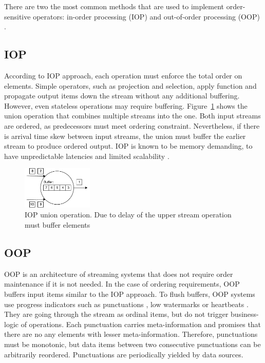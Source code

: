
\label {fs-typical}

There are two the most common methods that are used to implement order-sensitive operators: in-order processing (IOP) \cite{Arasu:2006:CCQ:1146461.1146463, Cranor:2003:GSD:872757.872838, hammad2004optimizing} and out-of-order processing (OOP) \cite{Li:2008:OPN:1453856.1453890}.

\subsection{IOP}

According to IOP approach, each operation must enforce the total order on elements. Simple operators, such as projection and selection, apply function and propagate output items down the stream without any additional buffering. However, even stateless operations may require buffering. Figure~\ref{iop} shows the union operation that combines multiple streams into the one. Both input streams are ordered, as predecessors must meet ordering constraint. Nevertheless, if there is arrival time skew between input streams, the union must buffer the earlier stream to produce ordered output. IOP is known to be memory demanding, to have unpredictable latencies and limited scalability \cite{Li:2008:OPN:1453856.1453890}.

\begin{figure}[htbp]
  \centering
  \includegraphics[width=0.30\textwidth]{pics/iop}
  \caption{IOP union operation. Due to delay of the upper stream operation must buffer elements}
  \label {iop}
\end{figure}

\subsection{OOP}

OOP is an architecture of streaming systems that does not require order maintenance if it is not needed. In the case of ordering requirements, OOP buffers input items similar to the IOP approach. To flush buffers, OOP systems use progress indicators such as punctuations \cite{Tucker:2003:EPS:776752.776780}, low watermarks \cite{Akidau:2013:MFS:2536222.2536229} or heartbeats \cite{Srivastava:2004:FTM:1055558.1055596}. They are going through the stream as ordinal items, but do not trigger business-logic of operations. Each punctuation carries meta-information and promises that there are no any elements with lesser meta-information. Therefore, punctuations must be monotonic, but data items between two consecutive punctuations can be arbitrarily reordered. Punctuations are periodically yielded by data sources.

